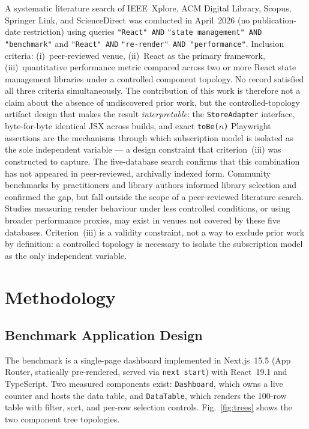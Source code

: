 \documentclass[conference]{IEEEtran}
\newcommand{\code}[1]{\texttt{\small #1}}
\begin{document}
A systematic literature search of IEEE~Xplore, ACM Digital Library,
Scopus, Springer Link, and ScienceDirect was conducted in April~2026
(no publication-date restriction) using queries \verb|"React" AND|
\verb|"state management" AND "benchmark"| and \verb|"React" AND|
\verb|"re-render" AND "performance"|. Inclusion criteria: (i)~peer-reviewed venue,
(ii)~React as the primary framework, (iii)~quantitative performance
metric compared across two or more React state management libraries
under a controlled component topology. No record satisfied all three criteria simultaneously.
The contribution of this work is therefore not a claim about the
absence of undiscovered prior work, but the controlled-topology
artifact design that makes the result \emph{interpretable}:
the \code{StoreAdapter} interface, byte-for-byte identical JSX
across builds, and exact \code{toBe($n$)} Playwright assertions
are the mechanisms through which subscription model is isolated
as the sole independent variable --- a design constraint that
criterion~(iii) was constructed to capture.
The five-database search confirms that this combination has not
appeared in peer-reviewed, archivally indexed form.
Community benchmarks by practitioners and library authors informed
library selection and confirmed the gap, but fall outside the scope of
a peer-reviewed literature search.
Studies measuring render behaviour under less controlled conditions,
or using broader performance proxies, may exist in venues not covered
by these five databases.
Criterion~(iii) is a validity constraint, not a way to exclude prior
work by definition: a controlled topology is necessary to isolate the
subscription model as the only independent variable.

\section{Methodology}
\label{sec:methodology}

\subsection{Benchmark Application Design}

The benchmark is a single-page dashboard implemented in Next.js~15.5
(App Router, statically pre-rendered, served via \code{next start}) with
React~19.1 and TypeScript. Two measured components exist: \code{Dashboard},
which owns a live counter and hosts the data table, and \code{DataTable},
which renders the 100-row table with filter, sort, and per-row selection
controls. Fig.~\ref{fig:trees} shows the two component tree topologies.
\end{document}

